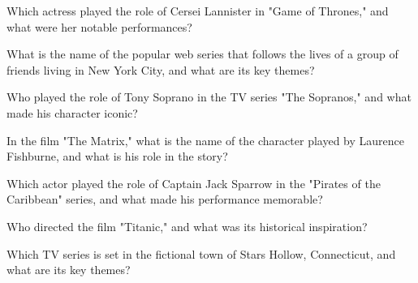 \documentclass[12pt,a4paper]{book}
\begin{document}
\begin{enhancedmcq}[Question 21]{Which actress played the role of Cersei Lannister in "Game of Thrones," and what were her notable performances?}
\end{enhancedmcq}

\begin{enhancedmcq}[Question 22]{What is the name of the popular web series that follows the lives of a group of friends living in New York City, and what are its key themes?}
\end{enhancedmcq}

\begin{enhancedmcq}[Question 23]{Who played the role of Tony Soprano in the TV series "The Sopranos," and what made his character iconic?}
\end{enhancedmcq}

\begin{enhancedmcq}[Question 24]{In the film "The Matrix," what is the name of the character played by Laurence Fishburne, and what is his role in the story?}
\end{enhancedmcq}

\begin{enhancedmcq}[Question 25]{Which actor played the role of Captain Jack Sparrow in the "Pirates of the Caribbean" series, and what made his performance memorable?}
\end{enhancedmcq}

\begin{enhancedmcq}[Question 26]{Who directed the film "Titanic," and what was its historical inspiration?}
\end{enhancedmcq}

\begin{enhancedmcq}[Question 27]{Which TV series is set in the fictional town of Stars Hollow, Connecticut, and what are its key themes?}
\end{enhancedmcq}
\end{document}
